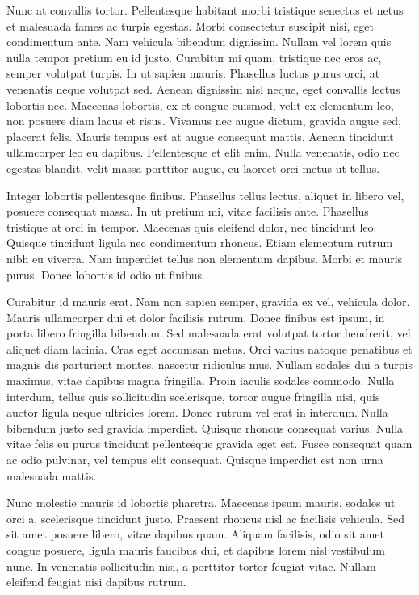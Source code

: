 Nunc at convallis tortor. Pellentesque habitant morbi tristique senectus et netus et malesuada fames ac turpis egestas. Morbi consectetur suscipit nisi, eget condimentum ante. Nam vehicula bibendum dignissim. Nullam vel lorem quis nulla tempor pretium eu id justo. Curabitur mi quam, tristique nec eros ac, semper volutpat turpis. In ut sapien mauris. Phasellus luctus purus orci, at venenatis neque volutpat sed. Aenean dignissim nisl neque, eget convallis lectus lobortis nec. Maecenas lobortis, ex et congue euismod, velit ex elementum leo, non posuere diam lacus et risus. Vivamus nec augue dictum, gravida augue sed, placerat felis. Mauris tempus est at augue consequat mattis. Aenean tincidunt ullamcorper leo eu dapibus. Pellentesque et elit enim. Nulla venenatis, odio nec egestas blandit, velit massa porttitor augue, eu laoreet orci metus ut tellus.

Integer lobortis pellentesque finibus. Phasellus tellus lectus, aliquet in libero vel, posuere consequat massa. In ut pretium mi, vitae facilisis ante. Phasellus tristique at orci in tempor. Maecenas quis eleifend dolor, nec tincidunt leo. Quisque tincidunt ligula nec condimentum rhoncus. Etiam elementum rutrum nibh eu viverra. Nam imperdiet tellus non elementum dapibus. Morbi et mauris purus. Donec lobortis id odio ut finibus.

Curabitur id mauris erat. Nam non sapien semper, gravida ex vel, vehicula dolor. Mauris ullamcorper dui et dolor facilisis rutrum. Donec finibus est ipsum, in porta libero fringilla bibendum. Sed malesuada erat volutpat tortor hendrerit, vel aliquet diam lacinia. Cras eget accumsan metus. Orci varius natoque penatibus et magnis dis parturient montes, nascetur ridiculus mus. Nullam sodales dui a turpis maximus, vitae dapibus magna fringilla. Proin iaculis sodales commodo. Nulla interdum, tellus quis sollicitudin scelerisque, tortor augue fringilla nisi, quis auctor ligula neque ultricies lorem. Donec rutrum vel erat in interdum. Nulla bibendum justo sed gravida imperdiet. Quisque rhoncus consequat varius. Nulla vitae felis eu purus tincidunt pellentesque gravida eget est. Fusce consequat quam ac odio pulvinar, vel tempus elit consequat. Quisque imperdiet est non urna malesuada mattis.

Nunc molestie mauris id lobortis pharetra. Maecenas ipsum mauris, sodales ut orci a, scelerisque tincidunt justo. Praesent rhoncus nisl ac facilisis vehicula. Sed sit amet posuere libero, vitae dapibus quam. Aliquam facilisis, odio sit amet congue posuere, ligula mauris faucibus dui, et dapibus lorem nisl vestibulum nunc. In venenatis sollicitudin nisi, a porttitor tortor feugiat vitae. Nullam eleifend feugiat nisi dapibus rutrum.

